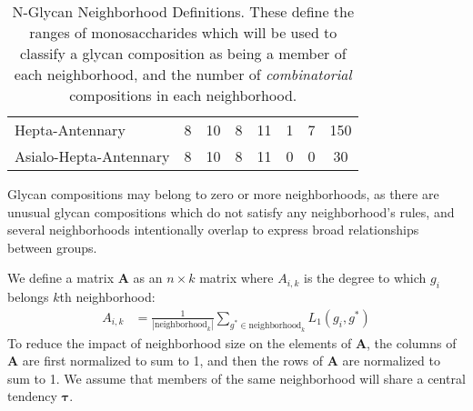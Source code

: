 \begin{table}[tb]
\begin{tabular}{l |S|S| S|S| S|S| S}
                Hepta-Antennary       &     8         &     10     &       8     &     11    &       1       &      7    &  150\\
                Asialo-Hepta-Antennary&     8         &     10     &       8     &     11    &       0       &      0    &  30\\
                \bottomrule
            \end{tabular}
            \caption{N-Glycan Neighborhood Definitions. These define the ranges of monosaccharides which
            will be used to classify a glycan composition as being a member of each neighborhood, and the number
            of \textit{combinatorial} \nglycan compositions in each neighborhood.}
            \label{tab:neighborhood_definitions}
        \end{table}

        Glycan compositions may belong to zero or more neighborhoods,
        as there are unusual glycan compositions which do not satisfy
        any neighborhood's rules, and several neighborhoods intentionally
        overlap to express broad relationships between groups.

        We define a matrix $\mathbf{A}$ as an $n \times k$ matrix where
        $A_{i, k}$ is the degree to which $g_i$ belongs $k$th neighborhood:
        \begin{align}
            A_{i, k} &= \frac{1}{|\text{neighborhood}_k|}\sum_{
                g^* \in \text{neighborhood}_k}{L_1(g_i, g^*)}
        \end{align}
        To reduce the impact of neighborhood size on the elements
        of $\mathbf{A}$, the columns of $\mathbf{A}$ are first
        normalized to sum to 1, and then the rows of $\mathbf{A}$
        are normalized to sum to 1. We assume that members of the
        same neighborhood will share a central tendency $\mathbf{\tau}$.
